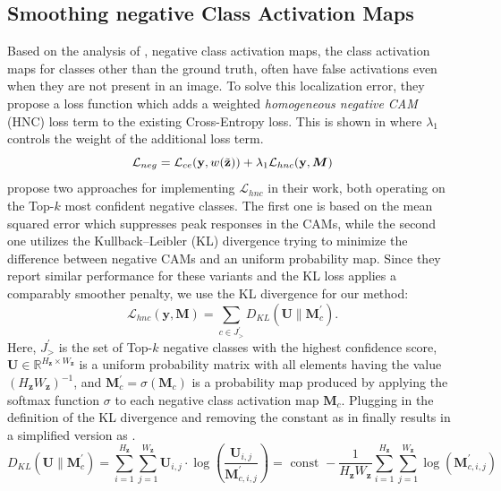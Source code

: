 \subsection{Smoothing negative Class Activation Maps}
Based on the analysis of \citet{sun2020fixing}, negative class activation maps, \ie the class activation maps for classes other than the ground truth, often have false activations even when they are not present in an image. To solve this localization error, they propose a loss function which adds a weighted \emph{homogeneous negative CAM} (HNC) loss term to the existing Cross-Entropy loss. This is shown in  where $\lambda_1$ controls the weight of the additional loss term. 
\begin{equation}
\label{eq:hnc}
\mathcal{L}_{neg} =\mathcal{L}_{ce}(\mathbf{y}, w(\Tilde{\mathbf{z}}))+\lambda_1 \mathcal{L}_{hnc}(\mathbf{y}, \boldsymbol{M})
\end{equation}
\citet{sun2020fixing} propose two approaches for implementing $\mathcal{L}_{hnc}$ in their work, both operating on the Top-$k$ most confident negative classes. The first one is based on the mean squared error which suppresses peak responses in the CAMs, while the second one utilizes the Kullback–Leibler (KL) divergence trying to minimize the difference between negative CAMs and an uniform probability map. Since they report similar performance for these variants and the KL loss applies a comparably smoother penalty, we use the KL divergence for our method:
\begin{equation}
\label{eq:hnc-kl}
\mathcal{L}_{hnc}(\mathbf{y}, \boldsymbol{M})=\sum_{c \in J^{\prime}_>} D_{K L}\left(\boldsymbol{U} \| \boldsymbol{M}_{c}^{\prime}\right).
\end{equation}
Here, $J^{\prime}_>$ is the set of Top-$k$ negative classes with the highest confidence score, $\boldsymbol{U} \in \mathbb{R}^{H_\mathbf{z} \times W_\mathbf{z}}$ is a uniform probability matrix with all elements having the value $(H_\mathbf{z}W_\mathbf{z})^{-1}$, and $\boldsymbol{M}_{c}^{\prime} = \sigma(\boldsymbol{M}_{c})$ is a probability map produced by applying the softmax function $\sigma$ to each negative class activation map $\boldsymbol{M}_{c}$. Plugging in the definition of the KL divergence and removing the constant as in  finally results in a simplified version as
.
\begin{equation}
\label{eq:kl-simplification}
D_{K L}\left(\boldsymbol{U} \| \boldsymbol{M}_{c}^{\prime}\right)=\sum_{i=1}^{H_\mathbf{z}} \sum_{j=1}^{W_\mathbf{z}} \boldsymbol{U}_{i,j} \cdot \log \left( \frac{\boldsymbol{U}_{i,j}}{\boldsymbol{M}_{c, i, j}^{\prime}} \right) =\text { const }-\frac{1}{H_\mathbf{z} W_\mathbf{z}} \sum_{i=1}^{H_\mathbf{z}} \sum_{j=1}^{W_\mathbf{z}} \log \left(\boldsymbol{M}_{c, i, j}^{\prime}\right)
\end{equation}
